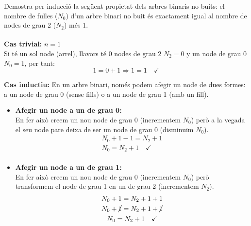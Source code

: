 \documentclass[11pt]{article}
\begin{document}
Demostra per inducció la següent propietat dels arbres binaris no buits: el
nombre de fulles ($N_0$) d’un arbre binari no buit és exactament igual al nombre
de nodes de grau 2 ($N_2$) més 1.
\begingroup
    \\[0.25cm]
\endgroup
\\
\textbf{Cas trivial:} $n = 1$\\
Si té un sol node (arrel), llavors té 0 nodes de grau 2 $N_2 = 0$ y un node de grau 0 $N_0 = 1$, per tant:
\[1 = 0 + 1 \Longrightarrow 1 = 1 \quad\checkmark\]

\textbf{Cas inductiu:} En un arbre binari, només podem afegir un node de dues formes: a un node de grau 0 (sense fills) o a un node de grau 1 (amb un fill).\\
    \begin{itemize}
        \item\textbf{Afegir un node a un de grau 0:}\\
            En fer això creem un nou node de grau 0 (incrementem $N_0$) però a la vegada el seu node pare deixa de ser un node de grau 0 (disminuïm $N_0$).
            \begin{gather*}
                N_0+1-1 = N_2 + 1\\
                N_0 = N_2 +1 \quad \checkmark\\
            \end{gather*}
        \item \textbf{Afegir un node a un de grau 1:}\\
             En fer això creem un nou node de grau 0 (incrementem $N_0$) però transformem el node de grau 1 en un de grau 2 (incrementem $N_2$).
            \begin{gather*}
                N_0+1 = N_2 + 1 + 1\\
                N_0 +\cancel{1} = N_2 + 1 +\cancel{ 1}\\
                N_0 = N_2 +1 \quad \checkmark\\
            \end{gather*}
    \end{itemize}
\end{document}
